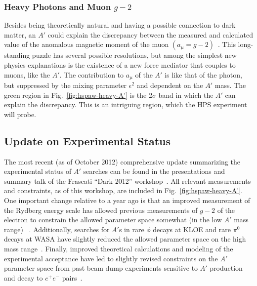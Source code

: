 \subsubsection{Heavy Photons and Muon $g-2$}

Besides being theoretically natural and having a possible connection to dark matter, an $A'$ could explain the discrepancy between the measured and 
calculated value of the anomalous magnetic moment of the muon $(a_\mu=g-2)$~\cite{Pospelov:2008zw}.  
This long-standing puzzle has several possible resolutions, but among the simplest new physics explanations
is the existence of a new force mediator that couples to muons, like the $A'$.  The contribution to $a_\mu$ of the $A'$ 
is like that of the photon, but suppressed by the mixing parameter $\epsilon^2$ and dependent on the $A'$ mass.  
The green region in Fig.~\ref{fig:hspaw-heavy-A'} is the 2$\sigma$ band in which the $A'$ can 
explain the discrepancy.  This is an intriguing region, which the HPS experiment will probe.  

\subsection{Update on Experimental Status}

The most recent (as of October 2012) comprehensive update summarizing the experimental status of $A'$ searches 
can be found in the presentations and summary talk of the Frascati ``Dark 2012'' workshop~\cite{Dark2012}.
All relevant measurements and constraints, as of this workshop, are included in Fig.~\ref{fig:hspaw-heavy-A'}.
One important change relative to a year ago is that an improved measurement of the Rydberg energy scale 
has allowed previous measurements of $g-2$ of the electron to constrain the allowed parameter space somewhat (in the low $A'$ mass range)
~\cite{endo:g2e,Davoudiasl:2012ig}.  
Additionally, searches for $A'$s in rare $\phi$ decays at KLOE and rare $\pi^0$ decays at WASA have slightly reduced 
the allowed parameter space on the high mass range~\cite{rarek}. 
Finally, improved theoretical calculations and modeling of the experimental acceptance have led to slightly revised constraints on the 
$A'$ parameter space from past beam dump experiments sensitive to $A'$ production and decay to $e^+e^-$ pairs~\cite{andreas}.

